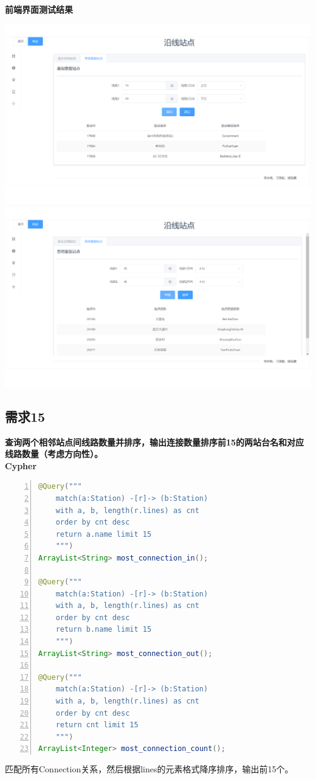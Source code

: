 \documentclass[11pt,a4paper]{article}
\begin{document}
\textbf{前端界面测试结果} \\
\begin{center}
\centering
\includegraphics[scale=0.3]{./assets/demand13_1.png} \\ 
\includegraphics[scale=0.3]{./assets/demand13_2.png} 
\end{center}

\subsection{需求15}
\textbf{查询两个相邻站点间线路数量并排序，输出连接数量排序前15的两站台名和对应线路数量（考虑方向性）。} \\
\textbf{Cypher} \\
\begin{lstlisting}[numbers = left, 
showstringspaces=false,
showspaces = false,
breaklines = true, 
language=Java]
@Query("""
	match(a:Station) -[r]-> (b:Station)
	with a, b, length(r.lines) as cnt
	order by cnt desc
	return a.name limit 15
	""")
ArrayList<String> most_connection_in();

@Query("""
	match(a:Station) -[r]-> (b:Station)
	with a, b, length(r.lines) as cnt
	order by cnt desc
	return b.name limit 15
	""")
ArrayList<String> most_connection_out();

@Query("""
	match(a:Station) -[r]-> (b:Station)
	with a, b, length(r.lines) as cnt
	order by cnt desc
	return cnt limit 15
	""")
ArrayList<Integer> most_connection_count();
\end{lstlisting} 
匹配所有Connection关系，然后根据lines的元素格式降序排序，输出前15个。
\end{document}
